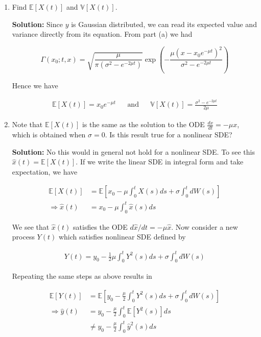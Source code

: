 \documentclass[12pt, a4paper]{article}
\begin{document}
\begin{enumerate}
\begin{enumerate}
        \item Find $\mathbb E[X(t)]$ and $\mathbb V[X(t)]$.

        \textbf{Solution:} Since $y$ is Gaussian distributed, we can read its expected value and variance directly from its equation. From part (a) we had

        $$\Gamma(x_0; t,x) = \sqrt{\frac{\mu}{\pi(\sigma^2-e^{-2\mu t})}} \exp \left(-\frac{\mu  \left(x-x_0 e^{-\mu t}\right)^2}{\sigma ^2-e^{-2 \mu  t}}\right)$$

        Hence we have

        \begin{align*}
            \mathbb E [X(t)] = x_0 e^{-\mu t} && \text{and} && \mathbb V[X(t)] = \frac{\sigma^2 - e^{-2\mu t}}{2 \mu}
        \end{align*}

        \item Note that $\mathbb E[X(t)]$ is the same as the solution to the ODE $\frac{dx}{dt} = -\mu x$, which is obtained when $\sigma=0$. Is this result true for a nonlinear SDE?

        \textbf{Solution:} No this would in general not hold for a nonlinear SDE. To see this $\hat x(t) = \mathbb E[X(t)]$. If we write the linear SDE in integral form and take expectation, we have
        
        \begin{align*}
            \mathbb E[X(t)] &= \mathbb E \left[ x_0 -\mu \int_0^t X(s) ds + \sigma \int_0^t dW(s) \right] \\
            \Rightarrow \hat x(t) &= x_0 - \mu \int_0^t \hat x(s) ds
        \end{align*}

        We see that $\hat x(t)$ satisfies the ODE $d\hat x/dt=-\mu \hat x$. Now consider a new process $Y(t)$ which satisfies nonlinear SDE defined by

        \begin{align*}
            Y(t) = y_0 -\frac{1}{2} \mu \int_0^t Y^2(s) ds + \sigma \int_0^t dW(s) 
        \end{align*}

        Repeating the same steps as above results in

        \begin{align*}
            \mathbb E[Y(t)] &= \mathbb E \left[ y_0 - \frac{\mu}{2} \int_0^t Y^2(s) ds + \sigma \int_0^t dW(s) \right] \\
            \Rightarrow \hat y(t) &= y_0 - \frac{\mu}{2} \int_0^t \mathbb E[Y^2(s)]ds \\
            &\ne y_0 - \frac{\mu}{2} \int_0^t \hat y^2(s) ds
        \end{align*}


\end{enumerate}
\end{enumerate}
\end{document}
